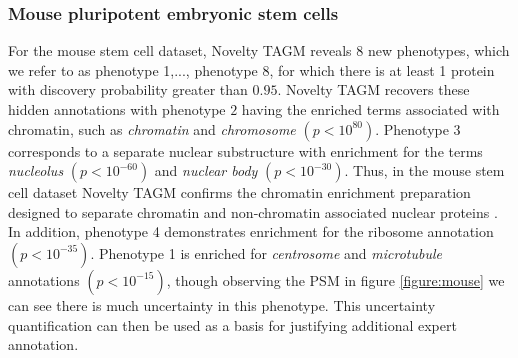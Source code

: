 \documentclass[12pt,english]{article}
\begin{document}
\subsubsection{Mouse pluripotent embryonic stem cells}
For the mouse stem cell dataset, Novelty TAGM reveals $8$ new phenotypes, which we refer to as phenotype 1,..., phenotype 8, for which there is at least 1 protein with discovery probability greater than $0.95$. Novelty TAGM recovers these hidden annotations with phenotype $2$ having the enriched terms associated with chromatin, such as \textit{chromatin} and \textit{chromosome} $(p < 10^{80})$. Phenotype 3 corresponds to a separate nuclear substructure with enrichment for the terms \textit{nucleolus} $(p < 10^{-60})$ and \textit{nuclear body} $(p < 10^{-30})$. Thus, in the mouse stem cell dataset Novelty TAGM confirms the chromatin enrichment preparation designed to separate chromatin and non-chromatin associated nuclear proteins \citep{Mulvey:2017}. In addition, phenotype 4 demonstrates enrichment for the ribosome annotation $(p < 10^{-35})$. Phenotype 1 is enriched for \textit{centrosome} and \textit{microtubule} annotations $(p < 10^{-15})$, though observing the PSM in figure \ref{figure:mouse} we can see there is much uncertainty in this phenotype. This uncertainty quantification can then be used as a basis for justifying additional expert annotation.
\end{document}
